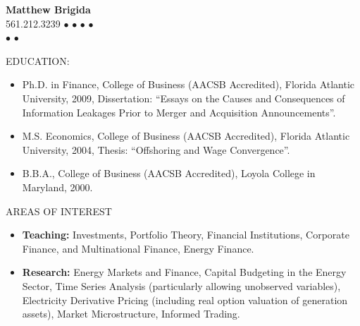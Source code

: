 \documentclass[9pt]{article}
\begin{document}
\fontsize{9}{11}\selectfont
\begin{center}
{\bf  {\Large Matthew Brigida}}\\
\hspace*{22pt}561.212.3239 $\bullet$ \href{mailto: mbrigida@clarion.edu}{} $\bullet$ \href{mailto:matt@complete-markets.com}{} $\bullet$ \href{http://www.complete-markets.com}{\color{Blue}{Complete Markets}} $\bullet$ \href{http://www.complete-markets.com}{\color{Blue}{YouTube}}\\
\hspace*{22pt} \href{https://github.com/Matt-Brigida/job_market_materials/raw/master/teaching_phil/teaching_phil.pdf}{\color{Blue}{Statement of Teaching Philosophy}} $\bullet$ \href{https://github.com/Matt-Brigida/job_market_materials/raw/master/Evidence_teaching_effectiveness/Brigida_evidence_teaching_effectiveness.pdf}{\color{Blue}{Evidence of Teaching Effectiveness}} $\bullet$ \href{https://github.com/Matt-Brigida/job_market_materials/raw/master/research_phil/research_phil.pdf}{\color{Blue}{Statement of Research Philosophy}}
\end{center}
EDUCATION:
\begin{itemize}[noitemsep, nolistsep]
\item Ph.D. in Finance, College of Business (AACSB Accredited), Florida Atlantic University, 2009, Dissertation:
``Essays on the Causes and Consequences of Information Leakages Prior to Merger and Acquisition
Announcements''.
\item M.S. Economics, College of Business (AACSB Accredited), Florida Atlantic University, 2004, Thesis: ``Offshoring
and Wage Convergence''.
\item B.B.A., College of Business (AACSB Accredited), Loyola College in Maryland, 2000.
\end{itemize}
\vspace{10pt}
AREAS OF INTEREST
\begin{itemize}[noitemsep, nolistsep]
\item {\bf Teaching:} Investments, Portfolio Theory, Financial Institutions, Corporate Finance, and Multinational Finance, Energy Finance.
\item {\bf Research:} Energy Markets and Finance, Capital Budgeting in the Energy Sector, Time Series Analysis (particularly allowing unobserved variables), Electricity Derivative Pricing (including real option valuation of generation assets), Market Microstructure, Informed Trading.
\end{itemize}
\end{document}
